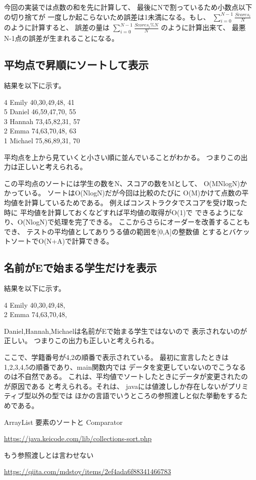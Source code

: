 \documentclass[dvipdfmx]{jsarticle}
\begin{document}
今回の実装では点数の和を先に計算して、
最後にNで割っているため小数点以下の切り捨てが
一度しか起こらないため誤差は1未満になる。もし、
$\displaystyle \sum_{i=0}^{N-1} \frac{Scores_i}{N}$
のように計算すると、
誤差の量は
$\displaystyle \sum_{i=0}^{N-1} \frac{Scores_i \% N}{N}$
のように計算出来て、
最悪N-1点の誤差が生まれることになる。

\subsection{平均点で昇順にソートして表示}
結果を以下に示す。
\begin{screen}
  4     Emily 40,30,49,48, 41\\
  5    Daniel 46,59,47,70, 55\\
  3    Hannah 73,45,82,31, 57\\
  2      Emma 74,63,70,48, 63\\
  1   Michael 75,86,89,31, 70
\end{screen}

平均点を上から見ていくと小さい順に並んでいることがわかる。
つまりこの出力は正しいと考えられる。

この平均点のソートには学生の数をN、スコアの数をMとして、
O(MNlogN)かかっている。
ソートはO(NlogN)だが今回は比較のたびに
O(M)かけて点数の平均値を計算しているためである。
例えばコンストラクタでスコアを受け取った時に
平均値を計算しておくなどすれば平均値の取得がO(1)で
できるようになり、O(NlogN)で処理を完了できる。
ここからさらにオーダーを改善することもでき、
テストの平均値としてありうる値の範囲を[0,A]の整数値
とするとバケットソートでO(N+A)で計算できる。

\subsection{名前がEで始まる学生だけを表示}
結果を以下に示す。
\begin{screen}
  4     Emily 40,30,49,48,\\
  2      Emma 74,63,70,48, 
\end{screen}

Daniel,Hannah,Michaelは名前がEで始まる学生ではないので
表示されないのが正しい。
つまりこの出力も正しいと考えられる。

ここで、学籍番号が4,2の順番で表示されている。
最初に宣言したときは1,2,3,4,5の順番であり、main関数内では
データを変更していないのでこうなるのは不自然である。
これは、平均値でソートしたときにデータが変更されたのが原因である
と考えられる。それは、
javaには値渡ししか存在しないがプリミティブ型以外の型では
ほかの言語でいうところの参照渡しと似た挙動をするためである。

\begin{thebibliography}{10}
   ArrayList 要素のソートと Comparator 
  
  \url{https://java.keicode.com/lib/collections-sort.php}
  
   もう参照渡しとは言わせない 
  
  \url{https://qiita.com/mdstoy/items/2ef4ada6f88341466783}
\end{thebibliography}
\end{document}
